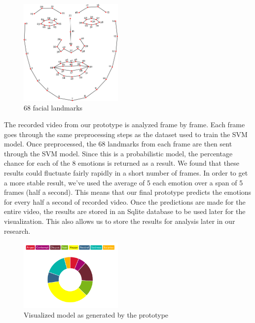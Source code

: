 \documentclass[sigconf]{acmart}
\begin{document}
\begin{figure}[h]
    \centering
    \includegraphics[width=0.45\textwidth, scale=1]{landmarks.png}
    \caption{68 facial landmarks}
\end{figure}

The recorded video from our prototype is analyzed frame by frame. Each frame goes through the same preprocessing
steps as the dataset used to train the SVM model. Once preprocessed, the 68 landmarks from each frame are then
sent through the SVM model. Since this is a probabilistic model, the percentage chance for each of the 8 emotions
is returned as a result. We found that these results could fluctuate fairly rapidly in a short number of frames.
In order to get a more stable result, we've used the average of 5 each emotion over a span of 5 frames (half a
second). This means that our final prototype predicts the emotions for every half a second of recorded video.
Once the predictions are made for the entire video, the results are stored in an Sqlite database to be used
later for the visualization. This also allows us to store the results for analysis later in our research.

\begin{figure}[h]
    \centering
    \includegraphics[width=0.45\textwidth, scale=1]{visualization.png}
    \caption{Visualized model as generated by the prototype}
\end{figure}
\end{document}
